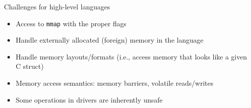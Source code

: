 \documentclass[NET,english,aspectratio=169,notitleframe]{tumbeamer}
\begin{document}
\begin{frame}{Challenges for high-level languages}
\begin{itemize}
\item Access to \texttt{mmap} with the proper flags
\item Handle externally allocated (foreign) memory in the language
\item Handle memory layouts/formats (i.e., access memory that looks like a given C struct)
\item Memory access semantics: memory barriers, volatile reads/writes
\item Some operations in drivers are inherently unsafe
\end{itemize}
\end{frame}
\end{document}
